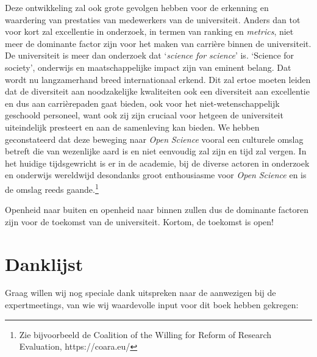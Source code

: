 \documentclass[smallauthor, chapterhaspagenum, nochapterinheader, pagenuminheader,  bigchapnum,medium2, tocpages,  garamond, titleinheader]{jote-book}
\begin{document}
	Deze ontwikkeling zal ook grote gevolgen hebben voor de erkenning en waardering van prestaties van medewerkers van de universiteit. Anders dan tot voor kort zal excellentie in onderzoek, in termen van ranking en \emph{metrics}, niet meer de dominante factor zijn voor het maken van carrière binnen de universiteit. De universiteit is meer dan onderzoek dat ‘\emph{science}\emph{ }\emph{for}\emph{ }\emph{science}' is. ‘Science for society', onderwijs en maatschappelijke impact zijn van eminent belang. Dat wordt nu langzamerhand breed internationaal erkend. Dit zal ertoe moeten leiden dat de diversiteit aan noodzakelijke kwaliteiten ook een diversiteit aan excellentie en dus aan carrièrepaden gaat bieden, ook voor het niet-wetenschappelijk geschoold personeel, want ook zij zijn cruciaal voor hetgeen de universiteit uiteindelijk presteert en aan de samenleving kan bieden. We hebben geconstateerd dat deze beweging naar \emph{Open }\emph{Science} vooral een culturele omslag betreft die van wezenlijke aard is en niet eenvoudig zal zijn en tijd zal vergen. In het huidige tijdsgewricht is er in de academie, bij de diverse actoren in onderzoek en onderwijs wereldwijd desondanks groot enthousiasme voor \emph{Open }\emph{Science} en is de omslag reeds gaande.\footnote{Zie bijvoorbeeld de Coalition of the Willing for Reform of Research Evaluation, https://coara.eu/}



	Openheid naar buiten en openheid naar binnen zullen dus de dominante factoren zijn voor de toekomst van de universiteit. Kortom, de toekomst is open!






	\chapter*{Danklijst}

	\nochapterinheader



	Graag willen wij nog speciale dank uitspreken naar de aanwezigen bij de expertmeetings, van wie wij waardevolle input voor dit boek hebben gekregen:



	\vspace*{\baselineskip}
\end{document}
